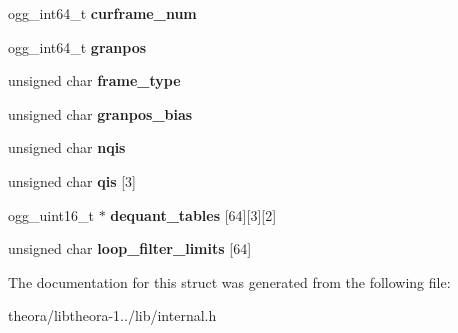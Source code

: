 \begin{DoxyCompactItemize}
\item 
\hypertarget{structoc__theora__state_ac181adaaadadc05e79e4ebb638aa61d2}{ogg\+\_\+int64\+\_\+t {\bfseries curframe\+\_\+num}}\label{structoc__theora__state_ac181adaaadadc05e79e4ebb638aa61d2}

\item 
\hypertarget{structoc__theora__state_a77a81d1fbf067d34223cadfc5f9eece8}{ogg\+\_\+int64\+\_\+t {\bfseries granpos}}\label{structoc__theora__state_a77a81d1fbf067d34223cadfc5f9eece8}

\item 
\hypertarget{structoc__theora__state_ab1650d1d2b5eb575a8e683f2098922a4}{unsigned char {\bfseries frame\+\_\+type}}\label{structoc__theora__state_ab1650d1d2b5eb575a8e683f2098922a4}

\item 
\hypertarget{structoc__theora__state_a5a802bc8f8eb0b4b8cf5d5b62e249ede}{unsigned char {\bfseries granpos\+\_\+bias}}\label{structoc__theora__state_a5a802bc8f8eb0b4b8cf5d5b62e249ede}

\item 
\hypertarget{structoc__theora__state_aee2af345f0ce5702506fac96fd88121b}{unsigned char {\bfseries nqis}}\label{structoc__theora__state_aee2af345f0ce5702506fac96fd88121b}

\item 
\hypertarget{structoc__theora__state_a35a1fdb10eb3eebc488d14d6363707da}{unsigned char {\bfseries qis} \mbox{[}3\mbox{]}}\label{structoc__theora__state_a35a1fdb10eb3eebc488d14d6363707da}

\item 
\hypertarget{structoc__theora__state_ab44bb5776e864e1dd53a581703931791}{ogg\+\_\+uint16\+\_\+t $\ast$ {\bfseries dequant\+\_\+tables} \mbox{[}64\mbox{]}\mbox{[}3\mbox{]}\mbox{[}2\mbox{]}}\label{structoc__theora__state_ab44bb5776e864e1dd53a581703931791}

\item 
\hypertarget{structoc__theora__state_a887230b493f4723391951a6cb5118049}{unsigned char {\bfseries loop\+\_\+filter\+\_\+limits} \mbox{[}64\mbox{]}}\label{structoc__theora__state_a887230b493f4723391951a6cb5118049}

\end{DoxyCompactItemize}


The documentation for this struct was generated from the following file\+:\begin{DoxyCompactItemize}
\item 
theora/libtheora-\/1../lib/internal.\+h\end{DoxyCompactItemize}
